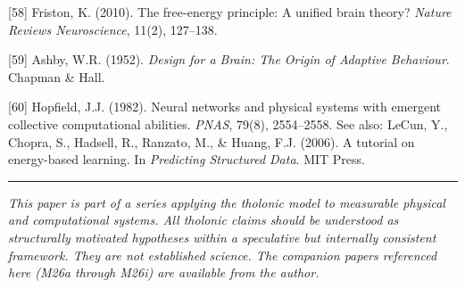 \documentclass[12pt]{article}
\begin{document}
{[}58{]} Friston, K. (2010). The free-energy principle: A unified brain
theory? \emph{Nature Reviews Neuroscience}, 11(2), 127--138.

{[}59{]} Ashby, W.R. (1952). \emph{Design for a Brain: The Origin of
Adaptive Behaviour}. Chapman \& Hall.

{[}60{]} Hopfield, J.J. (1982). Neural networks and physical systems
with emergent collective computational abilities. \emph{PNAS}, 79(8),
2554--2558. See also: LeCun, Y., Chopra, S., Hadsell, R., Ranzato, M.,
\& Huang, F.J. (2006). A tutorial on energy-based learning. In
\emph{Predicting Structured Data}. MIT Press.

\begin{center}\rule{0.5\linewidth}{0.5pt}\end{center}

\emph{This paper is part of a series applying the tholonic model to
measurable physical and computational systems. All tholonic claims
should be understood as structurally motivated hypotheses within a
speculative but internally consistent framework. They are not
established science. The companion papers referenced here (M26a through
M26i) are available from the author.}
\end{document}
